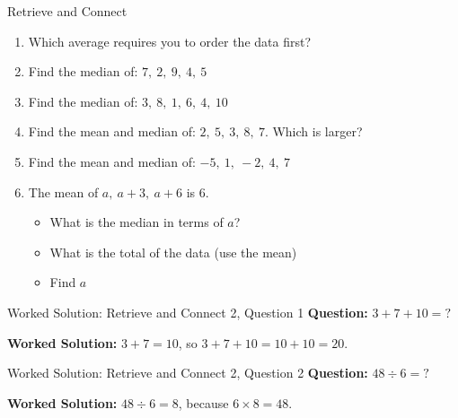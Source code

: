 \documentclass{beamer}
\newcommand{\ashow}[1]{\uncover<2->{\textcolor{red}{\small #1}}}
\newcommand{\ashowq}[1]{\alt<2->{\textcolor{red}{\small #1}}{?}}
\begin{document}
\begin{frame}{Retrieve and Connect}
\hypertarget{q-st2}{}
\vspace{-0.8em}

\footnotesize
\begin{enumerate}\itemsep2pt
  \item Which average requires you to order the data first? \ashow{Median}
  \item Find the median of: $7,\ 2,\ 9,\ 4,\ 5$ \ashow{$=5$}
  \item Find the median of: $3,\ 8,\ 1,\ 6,\ 4,\ 10$ \ashow{$=5$}
  \item Find the mean and median of: $2,\ 5,\ 3,\ 8,\ 7$.  
        Which is larger? \ashow{Mean $=5$, median $=5$ (equal).}
  \item Find the mean and median of: $-5,\ 1,\ -2,\ 4,\ 7$ \ashow{Mean $=1$, median $=1$.}
  \item The mean of $a,\ a+3,\ a+6$ is $6$.
        \begin{itemize}\footnotesize
        \item What is the median in terms of $a$? \ashow{$a+3$}
          \item What is the total of the data (use the mean) \ashow{$18$}
          \item Find $a$ \ashow{$a=3$}
        \end{itemize}
\end{enumerate}

\end{frame}

\begin{frame}{Worked Solution: Retrieve and Connect 2, Question 1}
\hypertarget{work-st2}{}
\small
\textbf{Question:} \(3+7+10=\mathord{?}\)

\smallskip
\textbf{Worked Solution:} \(3+7=10\), so \(3+7+10=10+10=20\).
\end{frame}

\begin{frame}{Worked Solution: Retrieve and Connect 2, Question 2}
\small
\textbf{Question:} \(48 \div 6=\mathord{?}\)

\smallskip
\textbf{Worked Solution:} \(48 \div 6 = 8\), because \(6 \times 8 = 48\).
\end{frame}
\end{document}

